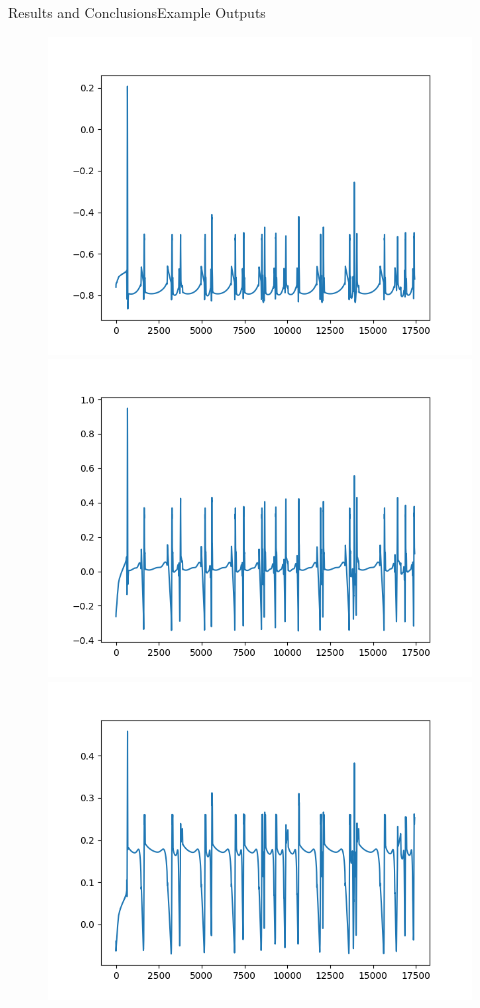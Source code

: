 \documentclass[handout]{beamer}
\begin{document}
\begin{frame}{Results and Conclusions}{Example Outputs}
\begin{center}
\begin{figure}
  \includegraphics[scale=0.2]{images/curr1_exp13_epoch190_pred}
  \includegraphics[scale=0.2]{images/curr2_exp13_epoch190_pred}
  \includegraphics[scale=0.2]{images/torque_exp13_epoch190_pred}

\end{figure}
\end{center}
\end{frame}
\end{document}
